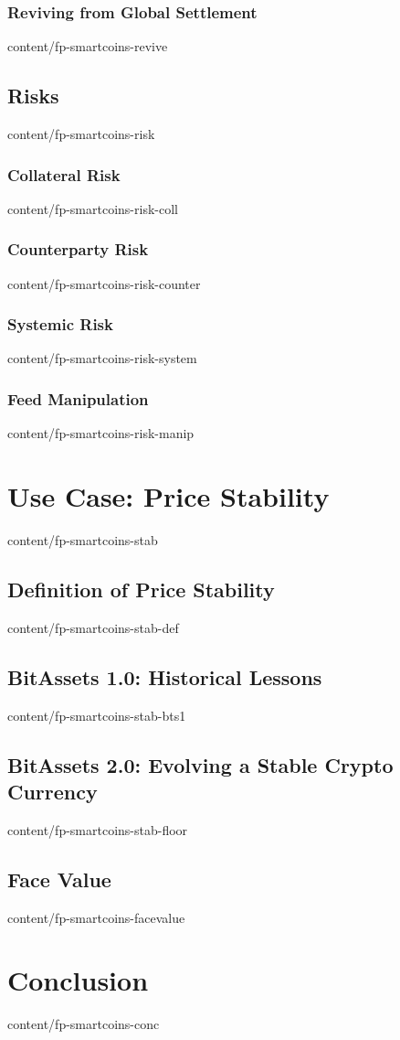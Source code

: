 \documentclass{btswhitepaper}
\begin{document}
\subsubsection { Reviving from Global Settlement                  }  { content/fp-smartcoins-revive      }

\subsection    { Risks                                            }  { content/fp-smartcoins-risk        }
\subsubsection { Collateral Risk                                  }  { content/fp-smartcoins-risk-coll   }
\subsubsection { Counterparty Risk                                }  { content/fp-smartcoins-risk-counter}
\subsubsection { Systemic Risk                                    }  { content/fp-smartcoins-risk-system }
\subsubsection { Feed Manipulation                                }  { content/fp-smartcoins-risk-manip  }

\section       { Use Case: Price Stability                        }  { content/fp-smartcoins-stab        }
\subsection    { Definition of Price Stability                    }  { content/fp-smartcoins-stab-def    }
\subsection    { BitAssets 1.0: Historical Lessons                }  { content/fp-smartcoins-stab-bts1   }
\subsection    { BitAssets 2.0: Evolving a Stable Crypto Currency }  { content/fp-smartcoins-stab-floor  }
\subsection    { Face Value                                       }  { content/fp-smartcoins-facevalue   }


\section       { Conclusion                                       }  { content/fp-smartcoins-conc        }


\end{document}
